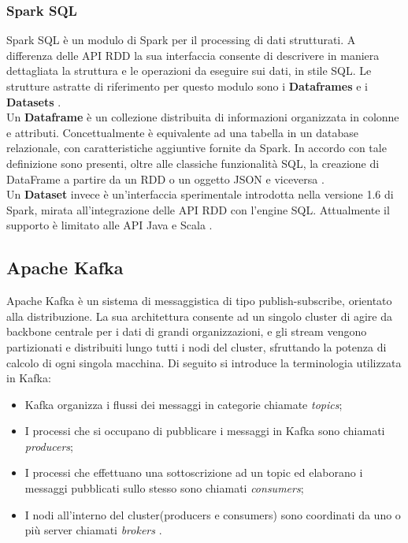 \documentclass[11pt]{article}
\begin{document}
\subsubsection{Spark SQL}

Spark SQL è un modulo di Spark per il processing di dati strutturati. A differenza delle API RDD la sua interfaccia consente di descrivere in maniera dettagliata la struttura e le operazioni da eseguire sui dati, in stile SQL. Le strutture astratte di riferimento per questo modulo sono i \textbf{Dataframes} e i \textbf{Datasets} \cite{spark}.\\

Un \textbf{Dataframe} è un collezione distribuita di informazioni organizzata in colonne e attributi. Concettualmente è equivalente ad una tabella in un database relazionale, con caratteristiche aggiuntive fornite da Spark. In accordo con tale definizione sono presenti, oltre alle classiche funzionalità SQL, la creazione di DataFrame a partire da un RDD o un oggetto JSON e viceversa \cite{spark}.\\

Un \textbf{Dataset} invece è un'interfaccia sperimentale introdotta nella versione 1.6 di Spark, mirata all'integrazione delle API RDD con l'engine SQL. Attualmente il supporto è limitato alle API Java e Scala \cite{spark}.

\subsection{Apache Kafka}

Apache Kafka è un sistema di messaggistica di tipo publish-subscribe, orientato alla distribuzione. La sua architettura consente ad un singolo cluster di agire da backbone centrale per i dati di grandi organizzazioni, e gli stream vengono partizionati e distribuiti lungo tutti i nodi del cluster, sfruttando la potenza di calcolo di ogni singola macchina. Di seguito si introduce la terminologia utilizzata in Kafka: 

\begin{itemize}
	\item Kafka organizza i flussi dei messaggi in categorie chiamate \textit{topics};
	\item I processi che si occupano di pubblicare i messaggi in Kafka sono chiamati \textit{producers};
	\item I processi che effettuano una sottoscrizione ad un topic ed elaborano i messaggi pubblicati sullo stesso sono chiamati \textit{consumers};
	\item I nodi all'interno del cluster(producers e consumers) sono coordinati da uno o più server chiamati \textit{brokers} \cite{kafka}.
	
\end{itemize}
\end{document}
